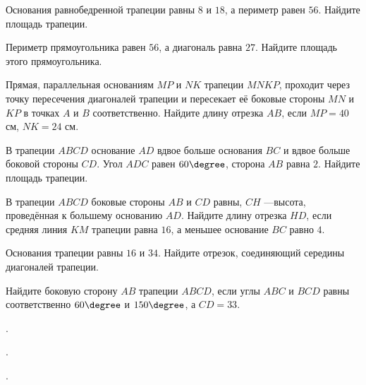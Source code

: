 \begin{class}[number=4]
	\begin{listofex}
		\item Основания равнобедренной трапеции равны \(8\) и \(18\), а периметр равен \(56\). Найдите площадь трапеции.
		\item Периметр прямоугольника равен \(56\), а диагональ равна \(27\). Найдите площадь этого прямоугольника.
		\item Прямая, параллельная основаниям \(MP\) и \(NK\) трапеции \(MNKP\), проходит через точку пересечения диагоналей трапеции и пересекает её боковые стороны \(MN\) и \(KP\) в точках  \(A\) и \(B\) соответственно. Найдите длину отрезка \(AB\), если \(MP=40\) см, \(NK=24\) см.
		\item В трапеции \(ABCD\) основание \(AD\) вдвое больше основания \(BC\) и вдвое больше боковой стороны \(CD\). Угол \(ADC\) равен \(60\degree\), сторона \(AB\) равна \(2\). Найдите площадь трапеции.
		\item В трапеции \(ABCD\) боковые стороны \(AB\) и \(CD\) равны, \(CH\) ---высота, проведённая к большему основанию \(AD\). Найдите длину отрезка \(HD\), если средняя линия \(KM\) трапеции равна \(16\), а меньшее основание \(BC\) равно \(4\).
		\item Основания трапеции равны \(16\) и \(34\). Найдите отрезок, соединяющий середины диагоналей трапеции.
		\item Найдите боковую сторону \(AB\) трапеции \(ABCD\), если углы \(ABC\) и \(BCD\) равны соответственно \(60\degree\) и \(150\degree\), а \(CD=33\).
	\end{listofex}
\end{class}

\begin{homework}[number=2]
	\begin{listofex}
		\item .
	\end{listofex}
\end{homework}

\begin{class}[number=5]
	\begin{listofex}
		\item .
	\end{listofex}
\end{class}

\begin{class}[number=6]
	\begin{listofex}
		\item .
	\end{listofex}
\end{class}

